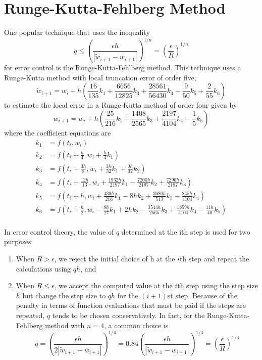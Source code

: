 \section{Runge-Kutta-Fehlberg Method}
\begin{thm}
	One popular technique that uses the inequality 
\[ q\leq \left( \frac{\epsilon h}{|\tilde{w}_{i+1} - w_{i+1}|} \right)^{1/n} = \left(\frac{\epsilon}{R}\right)^{1/n} \]
for error control is the Runge-Kutta-Fehlberg method. This technique uses a Runge-Kutta method with local truncation error of order five,
\[ \tilde{w}_{i+1} = w_i + h\left(\frac{16}{135}k_1 + \frac{6656}{12825}k_3 + \frac{28561}{56430}k_4 - \frac{9}{50}k_5 + \frac{2}{55}k_6\right) \]
to estimate the local error in a Runge-Kutta method of order four given by
\[ w_{i+1} = w_i + h\left(\frac{25}{216}k_1 + \frac{1408}{2565}k_3 + \frac{2197}{4104}k_4 - \frac{1}{5}k_5\right)\]
where the coefficient equations are
\begin{align*}
k_1 &= f(t_i,w_i)\\
k_2 &= f\left(t_i + \frac{h}{4}, w_i +\frac{h}{4}k_1\right)\\
k_3 &= f\left(t_i + \frac{3h}{8}, w_i +\frac{3h}{32}k_1 + \frac{9h}{32}k_2\right)\\
k_4 &= f\left(t_i + \frac{12h}{13}, w_i +\frac{1932h}{2197}k_1 - \frac{7200h}{2197}k_2 + \frac{7296h}{2197}k_3\right)\\
k_5 &= f\left(t_i + h, w_i +\frac{439h}{216}k_1 - 8hk_2 + \frac{3680h}{513}k_3 - \frac{845h}{4104}k_4\right)\\
k_6 &= f\left(t_i + \frac{h}{2}, w_i - \frac{8h}{27}k_1 + 2hk_2 - \frac{3544h}{2565}k_3 + \frac{1859h}{4104}k_4 - \frac{11h}{40}k_5 \right)\\
\end{align*}

In error control theory, the value of $q$ determined at the ith step is used for two purposes:\\
\begin{enumerate}
	\item
	When $R>\epsilon$, we reject the initial choice of h at the $i$th step and repeat the calculations using $qh$, and
	\item 
	When $R \leq \epsilon$, we accept the computed value at the $i$th step using the step size $h$ but change the step size to $qh$ for the $(i + 1)$st step.
	Because of the penalty in terms of function evaluations that must be paid if the steps are repeated, $q$ tends to be chosen conservatively. In fact, for the Runge-Kutta-Fehlberg method with $n = 4$, a common choice is
	\[ q = \left( \frac{\epsilon h}{2|\tilde{w}_{i+1} - w_{i+1}|} \right)^{1/4} = 0.84\left( \frac{\epsilon h}{|\tilde{w}_{i+1} - w_{i+1}|} \right)^{1/4} = \left(\frac{\epsilon}{R}\right)^{1/4} \]
\end{enumerate}

\end{thm}
